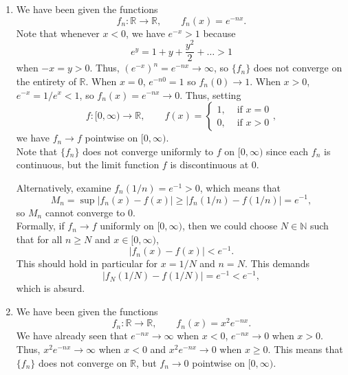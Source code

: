 \documentclass[10pt]{article}
\def\R{\mathbb{R}}
\def\N{\mathbb{N}}
\begin{document}
\begin{enumerate}
        Formally, given $\epsilon > 0$, we choose $N \in \N$ such that $Na\epsilon >
        1$. Thus, for all $n \geq N$ and $x \in [a, \infty)$, we have \[
            |f_n(x) - 0| = \frac{|\sin{nx}|}{1 + nx} \leq \frac{1}{1 + nx} \leq
            \frac{1}{na} \leq \frac{1}{Na} < \epsilon.
        \] This means that $f_n \to 0$ uniformly on $[a, \infty)$.


        \item We have been given the functions \[
            f_n\colon \R \to \R, \qquad f_n(x) = e^{-nx}.
        \] Note that whenever $x < 0$, we have $e^{-x} > 1$ because \[
            e^y = 1 + y + \frac{y^2}{2} + \dots > 1
        \] when $-x = y > 0$. Thus, $(e^{-x})^n = e^{-nx} \to \infty$, so $\{f_n\}$
        does not converge on the entirety of $\R$. When $x = 0$, $e^{-n0} = 1$ so
        $f_n(0) \to 1$. When $x > 0$, $e^{-x} = 1 /e^{x} < 1$, so $f_n(x) = e^{-nx} 
        \to 0$. Thus, setting \[
            f\colon [0,\infty) \to \R, \qquad f(x) = \begin{cases}
                1, &\text{ if } x = 0 \\
                0, &\text{ if } x > 0
            \end{cases},
        \] we have $f_n \to f$ pointwise on $[0, \infty)$. \\

        Note that $\{f_n\}$ does not converge uniformly to $f$ on $[0, \infty)$
        since each $f_n$ is continuous, but the limit function $f$ is discontinuous
        at $0$.

    
        Alternatively, examine $f_n(1 / n) = e^{-1} > 0$, which means that \[
            M_n = \sup|f_n(x) - f(x)| \geq |f_n(1 / n) - f(1 / n)| = e^{-1},
        \] so $M_n$ cannot converge to $0$. \\

        Formally, if $f_n \to f$ uniformly on $[0, \infty)$, then we could choose $N
        \in \N$ such that for all $n \geq N$ and $x \in [0, \infty)$, \[
            |f_n(x) - f(x)| < e^{-1}.
        \] This should hold in particular for $x = 1 / N$ and $n = N$. This demands
        \[
            |f_N(1 / N) - f(1 / N)| = e^{-1} < e^{-1},
        \] which is absurd.
        
        \item We have been given the functions \[
            f_n\colon \R \to \R, \qquad f_n(x) = x^2e^{-nx}.
        \] We have already seen that $e^{-nx} \to \infty$ when $x < 0$, $e^{-nx} \to
        0$ when $x > 0$. Thus, $x^2e^{-nx} \to \infty$ when $x < 0$ and $x^2e^{-nx}
        \to 0$ when $x \geq 0$. This means that $\{f_n\}$ does not converge on $\R$,
        but $f_n \to 0$ pointwise on $[0, \infty)$. \\


\end{enumerate}
\end{document}
